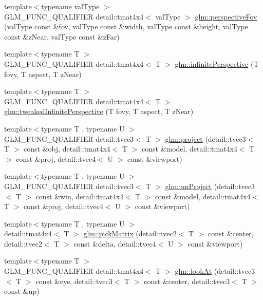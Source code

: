 \begin{DoxyCompactItemize}
\item 
{\footnotesize template$<$typename val\+Type $>$ }\\G\+L\+M\+\_\+\+F\+U\+N\+C\+\_\+\+Q\+U\+A\+L\+I\+F\+I\+E\+R detail\+::tmat4x4$<$ val\+Type $>$ \hyperlink{group__gtc__matrix__transform_gac2bbb4ae38c7cc549feefae5406517d7}{glm\+::perspective\+Fov} (val\+Type const \&fov, val\+Type const \&width, val\+Type const \&height, val\+Type const \&z\+Near, val\+Type const \&z\+Far)
\item 
{\footnotesize template$<$typename T $>$ }\\G\+L\+M\+\_\+\+F\+U\+N\+C\+\_\+\+Q\+U\+A\+L\+I\+F\+I\+E\+R detail\+::tmat4x4$<$ T $>$ \hyperlink{group__gtc__matrix__transform_ga414f3cfe1af5619acebd5c28cf6bd45c}{glm\+::infinite\+Perspective} (T fovy, T aspect, T z\+Near)
\item 
{\footnotesize template$<$typename T $>$ }\\G\+L\+M\+\_\+\+F\+U\+N\+C\+\_\+\+Q\+U\+A\+L\+I\+F\+I\+E\+R detail\+::tmat4x4$<$ T $>$ \hyperlink{group__gtc__matrix__transform_ga42299b3ef778f1d6120032da73b0ef87}{glm\+::tweaked\+Infinite\+Perspective} (T fovy, T aspect, T z\+Near)
\item 
{\footnotesize template$<$typename T , typename U $>$ }\\G\+L\+M\+\_\+\+F\+U\+N\+C\+\_\+\+Q\+U\+A\+L\+I\+F\+I\+E\+R detail\+::tvec3$<$ T $>$ \hyperlink{group__gtc__matrix__transform_ga6f081067aeffc662410dfbabb25f9fdc}{glm\+::project} (detail\+::tvec3$<$ T $>$ const \&obj, detail\+::tmat4x4$<$ T $>$ const \&model, detail\+::tmat4x4$<$ T $>$ const \&proj, detail\+::tvec4$<$ U $>$ const \&viewport)
\item 
{\footnotesize template$<$typename T , typename U $>$ }\\G\+L\+M\+\_\+\+F\+U\+N\+C\+\_\+\+Q\+U\+A\+L\+I\+F\+I\+E\+R detail\+::tvec3$<$ T $>$ \hyperlink{group__gtc__matrix__transform_ga540d5f6bb3f41e5dfa38d6ebd8771765}{glm\+::un\+Project} (detail\+::tvec3$<$ T $>$ const \&win, detail\+::tmat4x4$<$ T $>$ const \&model, detail\+::tmat4x4$<$ T $>$ const \&proj, detail\+::tvec4$<$ U $>$ const \&viewport)
\item 
{\footnotesize template$<$typename T , typename U $>$ }\\detail\+::tmat4x4$<$ T $>$ \hyperlink{group__gtc__matrix__transform_gaf711e3351e368706876106bc64673a91}{glm\+::pick\+Matrix} (detail\+::tvec2$<$ T $>$ const \&center, detail\+::tvec2$<$ T $>$ const \&delta, detail\+::tvec4$<$ U $>$ const \&viewport)
\item 
{\footnotesize template$<$typename T $>$ }\\G\+L\+M\+\_\+\+F\+U\+N\+C\+\_\+\+Q\+U\+A\+L\+I\+F\+I\+E\+R detail\+::tmat4x4$<$ T $>$ \hyperlink{group__gtc__matrix__transform_gae2dca3785b6d5796e876114af58a60a1}{glm\+::look\+At} (detail\+::tvec3$<$ T $>$ const \&eye, detail\+::tvec3$<$ T $>$ const \&center, detail\+::tvec3$<$ T $>$ const \&up)
\end{DoxyCompactItemize}


